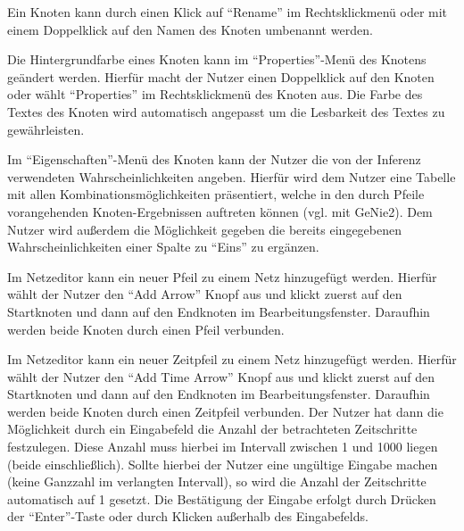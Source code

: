 \documentclass[parskip=full,11pt,twoside]{scrartcl}
\begin{document}
Ein Knoten kann durch einen Klick auf \enquote{Rename} im Rechtsklickmenü oder mit einem Doppelklick auf den Namen des Knoten umbenannt werden.

Die Hintergrundfarbe eines Knoten kann im \enquote{Properties}-Menü des Knotens geändert werden. Hierfür macht der Nutzer einen Doppelklick auf den Knoten oder wählt \enquote{Properties} im Rechtsklickmenü des Knoten aus. Die Farbe des Textes des Knoten wird automatisch angepasst um die Lesbarkeit des Textes zu gewährleisten. %

Im \enquote{Eigenschaften}-Menü des Knoten kann der Nutzer die von der Inferenz verwendeten Wahrscheinlichkeiten angeben. Hierfür wird dem Nutzer eine Tabelle mit allen Kombinationsmöglichkeiten präsentiert, welche in den durch Pfeile vorangehenden Knoten-Ergebnissen auftreten können (vgl. mit GeNie2). Dem Nutzer wird außerdem die Möglichkeit gegeben die bereits eingegebenen Wahrscheinlichkeiten einer Spalte zu \enquote{Eins} zu ergänzen.

Im Netzeditor kann ein neuer Pfeil zu einem Netz hinzugefügt werden. Hierfür wählt der Nutzer den \enquote{Add Arrow} Knopf aus und klickt zuerst auf den Startknoten und dann auf den Endknoten im Bearbeitungsfenster. Daraufhin werden beide Knoten durch einen Pfeil verbunden. %

Im Netzeditor kann ein neuer Zeitpfeil zu einem Netz hinzugefügt werden. Hierfür wählt der Nutzer den \enquote{Add Time Arrow} Knopf aus und klickt zuerst auf den Startknoten und dann auf den Endknoten im Bearbeitungsfenster. Daraufhin werden beide Knoten durch einen Zeitpfeil verbunden. Der Nutzer hat dann die Möglichkeit durch ein Eingabefeld die Anzahl der betrachteten Zeitschritte festzulegen. Diese Anzahl muss hierbei im Intervall zwischen 1 und 1000 liegen (beide einschließlich). Sollte hierbei der Nutzer eine ungültige Eingabe machen (keine Ganzzahl im verlangten Intervall), so wird die Anzahl der Zeitschritte automatisch auf 1 gesetzt. Die Bestätigung der Eingabe erfolgt durch Drücken der \enquote{Enter}-Taste oder durch Klicken außerhalb des Eingabefelds.
\end{document}
